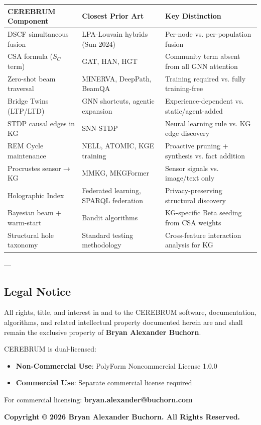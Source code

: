 \documentclass[10pt,journal,compsoc]{IEEEtran}
\begin{document}
\begin{center}
{\footnotesize
\begin{tabularx}{\columnwidth}{|>{\raggedright\arraybackslash}X|>{\raggedright\arraybackslash}X|>{\raggedright\arraybackslash}X|}
\hline
CEREBRUM Component & Closest Prior Art & Key Distinction \\ \hline
DSCF simul\-taneous fusion & LPA-Louvain hybrids (Sun 2024) & Per-node vs. per-population fusion \\ \hline
CSA formula ($S_C$ term) & GAT, HAN, HGT & Community term absent from all GNN attention \\ \hline
Zero-shot beam traversal & MINERVA, DeepPath, BeamQA & Training required vs. fully training-free \\ \hline
Bridge Twins (LTP/LTD) & GNN shortcuts, agentic expansion & Experience-dependent vs. static/agent-added \\ \hline
STDP causal edges in KG & SNN-STDP & Neural learning rule vs. KG edge discovery \\ \hline
REM Cycle maintenance & NELL, ATOMIC, KGE training & Proactive pruning + synthesis vs. fact addition \\ \hline
Procrustes sensor$\to$KG & MMKG, MKGFormer & Sensor signals vs. image/text only \\ \hline
Holographic Index & Federated learning, SPARQL federation & Privacy-preserving structural discovery \\ \hline
Bayesian beam + warm-start & Bandit algorithms & KG-specific Beta seeding from CSA weights \\ \hline
Structural hole taxonomy & Standard testing methodology & Cross-feature interaction analysis for KG \\ \hline
\end{tabularx}
}
\end{center}

---

\subsection{Legal Notice}

All rights, title, and interest in and to the CEREBRUM software, docum\-entation, algorithms, and related intel\-lectual property documented herein are and shall remain the exclusive property of \textbf{Bryan Alexander Buchorn}.

CEREBRUM is dual-licensed:
\begin{itemize}
\item \textbf{Non-Commercial Use}: PolyForm Noncom\-mercial License 1.0.0
\item \textbf{Commercial Use}: Separate commercial license required

\end{itemize}
For commercial licensing: \textbf{bryan.alexander@buchorn.com}

\textbf{Copyright © 2026 Bryan Alexander Buchorn. All Rights Reserved.}




\end{document}
